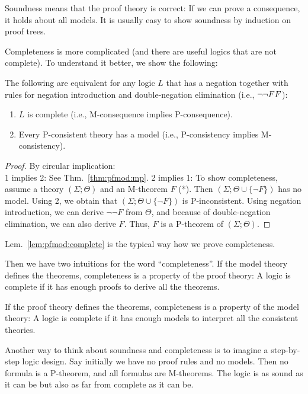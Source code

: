 Soundness means that the proof theory is correct: If we can prove a consequence, it holds about all models.
It is usually easy to show soundness by induction on proof trees.

Completeness is more complicated (and there are useful logics that are not complete).
To understand it better, we show the following:

\begin{lemma}\label{lem:pfmod:complete}
The following are equivalent for any logic $L$ that has a negation together with rules for negation introduction and double-negation elimination (i.e., $\neg \neg F F$):
\begin{enumerate}
 \item $L$ is complete (i.e., M-consequence implies P-consequence).
 \item Every P-consistent theory has a model (i.e., P-consistency implies M-consistency).
\end{enumerate}
\end{lemma}
\begin{proof}
By circular implication: \\
1 implies 2: See Thm.~\ref{thm:pfmod:mp}.
2 implies 1: To show completeness, assume a theory $(\Sigma;\Theta)$ and an M-theorem $F$ (*). Then $(\Sigma;\Theta\cup\{\neg F\})$ has no model. Using 2, we obtain that $(\Sigma;\Theta\cup\{\neg F\})$ is P-inconsistent. Using negation introduction, we can derive $\neg \neg F$ from $\Theta$, and because of double-negation elimination, we can also derive $F$. Thus, $F$ is a P-theorem of $(\Sigma;\Theta)$.
\end{proof}

Lem.~\ref{lem:pfmod:complete} is the typical way how we prove completeness.
\medskip

Then we have two intuitions for the word ``completeness''.
If the model theory defines the theorems, completeness is a property of the proof theory: A logic is complete if it has enough proofs to derive all the theorems.

If the proof theory defines the theorems, completeness is a property of the model theory: A logic is complete if it has enough models to interpret all the consistent theories.
\medskip

Another way to think about soundness and completeness is to imagine a step-by-step logic design.
Say initially we have no proof rules and no models.
Then no formula is a P-theorem, and all formulas are M-theorems.
The logic is as sound as it can be but also as far from complete as it can be.

